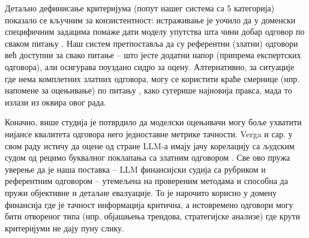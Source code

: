 Детаљно дефинисање критеријума (попут нашег система са 5 категорија) показало се кључним за конзистентност: истраживање је уочило да у доменски специфичним задацима помаже дати моделу упутства шта чини добар одговор по сваком питању \cite{clearwater_analytics_2023}. Наш систем претпоставља да су референтни (златни) одговори већ доступни за свако питање -- што јесте додатни напор (припрема експертских одговора), али осигурава поуздано сидро за оцену. Алтернативно, за ситуације где нема комплетних златних одговора, могу се користити краће смернице (нпр. напомене за оцењивање) по питању \cite{verga_replacing_judges_2024}, како сугерише најновија пракса, мада то излази из оквира овог рада.

Коначно, више студија је потврдило да моделски оцењивачи могу боље ухватити нијансе квалитета одговора него једноставне метрике тачности. Verga и сар. у свом раду истичу да оцене од стране LLM-а имају јачу корелацију са људским судом од рецимо буквалног поклапања са златним одговором \cite{verga_replacing_judges_2024}. Све ово пружа уверење да је наша поставка -- LLM финансијски судија са рубриком и референтним одговором -- утемељена на провереним методама и способна да пружи објективне и детаљне евалуације. То је нарочито корисно у домену финансија где је тачност информација критична, а истовремено одговори могу бити отвореног типа (нпр. објашњења трендова, стратегијске анализе) где крути критеријуми не дају пуну слику.

